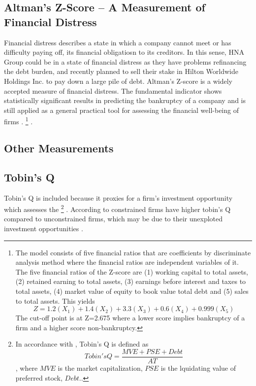 \documentclass[12pt]{article}
\begin{document}
\subsection{Altman's Z-Score -- A Measurement of Financial Distress}
Financial distress describes a state in which a company cannot meet or has difficulty paying off, its financial obligatiosn to its creditors. In this sense, HNA Group could be in a state of financial distress as they have problems refinancing the debt burden, and recently planned to sell their stake in Hilton Worldwide Holdings Inc. to pay down a large pile of debt. Altman's Z-score is a widely accepted measure of financial distress. The fundamental indicator shows statistically significant results in predicting the bankruptcy of a company \citep{Campbell2008} and is still applied as a general practical tool for assessing the financial well-being of firms \citep{Kleinert2014}. 
	\footnote{The model consists of five financial ratios that are coefficients by discriminate analysis method where the financial ratios are independent variables of it. The five financial ratios of the Z-score are (1) working capital to total assets, (2) retained earning to total assets, (3) earnings before interest and taxes to total assets, (4) market value of equity to book value total debt and (5) sales to total assets. This yields
		\begin{equation}
			Z=1.2(X_{1})+1.4(X_{2})+3.3(X_{3})+0.6(X_{4})+0.999(X_{5})
		\end{equation}
	The cut-off point is at Z=2.675 where a lower score implies bankruptcy of a firm and a higher score non-bankruptcy.}
.

\subsection{Other Measurements}

\subsection{Tobin's Q}
Tobin's Q is included because it proxies for a firm's investment opportunity which assesses the 
\footnote{In accordance with \citet{Brigida2012}, Tobin's Q is defined as 
\begin{equation}
	Tobin's Q= \frac{MVE + PSE + Debt}{AT}
\end{equation}, where $MVE$ is the market capitalization, $PSE$ is the lquidating value of preferred stock, $Debt$.. } 
\citep{DUCHIN2010}. According to \citet{Khatami2014} constrained firms have higher tobin's Q compared to unconstrained firms, which may be due to their unexploted investment opportunities \citep{Khatami2014}.
\end{document}
